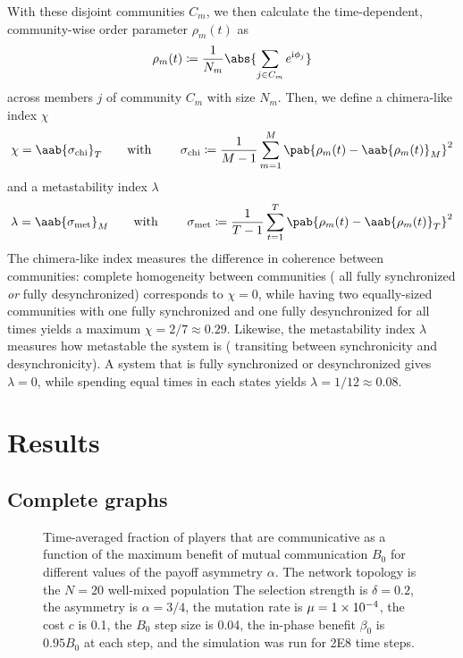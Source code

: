 \documentclass[pdflatex,lineno,referee,sn-mathphys-ay]{sn-jnl}
\begin{document}
With these disjoint communities $C_m$, we then calculate
the time-dependent, community-wise order parameter $\rho_m(t)$
as
\begin{equation}
  \rho_m(t) \coloneqq \frac{1}{N_m} \abs{\sum_{j \in C_m} e^{\im \phi_j}}
\end{equation}
across members $j$ of community $C_m$ with size $N_m$.
Then, we define a chimera-like index $\chi$
\begin{equation}
  \chi = \aab{
    \sigma_{\text{chi}}}_T
    \text{\qquad with \qquad}
    \sigma_{\text{chi}} \coloneqq \frac{1}{M-1} \sum_{m=1}^M
    \pab{\rho_m(t) - \aab{\rho_m(t)}_M}^2
  \label{eq:chimera_index}
\end{equation}
and a metastability index $\lambda$
\begin{equation}
  \lambda = \aab{
    \sigma_{\text{met}}}_M
    \text{\qquad with \qquad}
    \sigma_{\text{met}} \coloneqq \frac{1}{T-1} \sum_{t=1}^T
    \pab{\rho_m(t) - \aab{\rho_m(t)}_T}^2
  \label{eq:metastability_index}
\end{equation}
The chimera-like index measures the difference in coherence between communities:
complete homogeneity between communities
(\eg{} all fully synchronized \emph{or} fully desynchronized)
corresponds to $\chi = 0$,
while having two equally-sized communities
with one fully synchronized and one fully desynchronized
for all times yields a maximum $\chi = 2/7 \approx \num{0.29}$.
Likewise, the metastability index $\lambda$ measures how metastable
the system is (\ie{} transiting between synchronicity and desynchronicity).
A system that is fully synchronized or desynchronized gives $\lambda = 0$,
while spending equal times in each states yields $\lambda = 1/12 \approx \num{0.08}$.

\section{Results}
\label{sec:results}
\subsection{Complete graphs}
\label{sec:complete_graph}

\begin{figure}
  \centering
  
  \caption{
    Time-averaged fraction of players that are communicative as a function
    of the maximum benefit of mutual communication $B_0$
    for different values of the payoff asymmetry $\alpha$.
    The network topology is the
    $N=20$ well-mixed population
    The selection strength is $\delta=0.2$,
    the asymmetry is $\alpha=3/4$,
    the mutation rate is $\mu=\num{1E-4}$,
    the cost $c$ is \num{0.1},
    the $B_0$ step size is \num{0.04},
    the in-phase benefit $\beta_0$ is $\num{0.95} B_0$ at each step,
    and the simulation was run for \num{2E8} time steps.
  }
  \label{fig:multi-comm-frac}
\end{figure}
\end{document}
